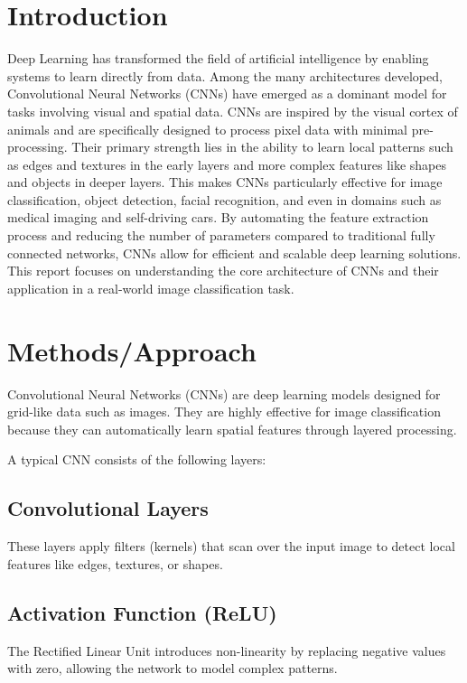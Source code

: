 \documentclass[12pt]{article}
\begin{document}
\section{Introduction}
Deep Learning has transformed the field of artificial intelligence by enabling systems to learn directly from data. Among the many architectures developed, Convolutional Neural Networks (CNNs) have emerged as a dominant model for tasks involving visual and spatial data. CNNs are inspired by the visual cortex of animals and are specifically designed to process pixel data with minimal pre-processing. Their primary strength lies in the ability to learn local patterns such as edges and textures in the early layers and more complex features like shapes and objects in deeper layers. This makes CNNs particularly effective for image classification, object detection, facial recognition, and even in domains such as medical imaging and self-driving cars. By automating the feature extraction process and reducing the number of parameters compared to traditional fully connected networks, CNNs allow for efficient and scalable deep learning solutions. This report focuses on understanding the core architecture of CNNs and their application in a real-world image classification task.

\section{Methods/Approach}
Convolutional Neural Networks (CNNs) are deep learning models designed for grid-like data such as images. They are highly effective for image classification because they can automatically learn spatial features through layered processing.

A typical CNN consists of the following layers:

\subsection{Convolutional Layers}
These layers apply filters (kernels) that scan over the input image to detect local features like edges, textures, or shapes.

\subsection{Activation Function (ReLU)}
The Rectified Linear Unit introduces non-linearity by replacing negative values with zero, allowing the network to model complex patterns.
\end{document}

